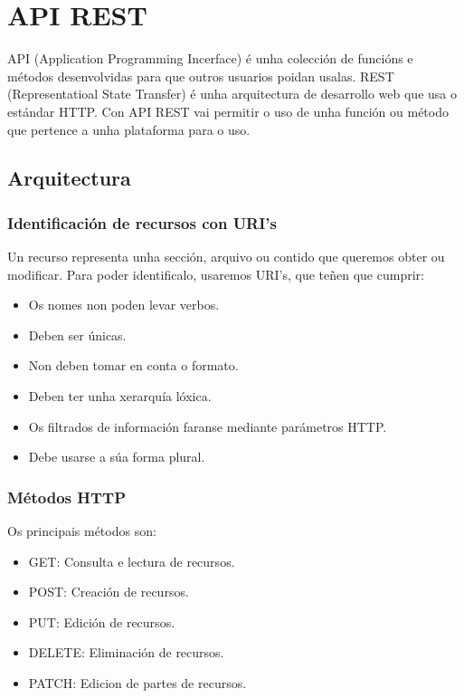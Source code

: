 \documentclass[11pt,twoside]{book}
\begin{document}
\section{API REST}

API (Application Programming Incerface) é unha colección de funcións e métodos desenvolvidas para que outros usuarios poidan usalas. 
REST (Representatioal State Transfer) é unha arquitectura de desarrollo web que usa o estándar HTTP. 
Con API REST vai permitir o uso de unha función ou método que pertence a unha plataforma para o uso.

\subsection{Arquitectura}

\subsubsection{Identificación de recursos con URI's}

Un recurso representa unha sección, arquivo ou contido que queremos obter ou modificar. Para poder identificalo, usaremos URI's, que teñen que cumprir:
\begin{itemize}
    \item Os nomes non poden levar verbos.
    \item Deben ser únicas.
    \item Non deben tomar en conta o formato.
    \item Deben ter unha xerarquía lóxica.
    \item Os filtrados de información faranse mediante parámetros HTTP.
    \item Debe usarse a súa forma plural.
\end{itemize}

\subsubsection{Métodos HTTP}

Os principais métodos son:

\begin{itemize}
    \item GET: Consulta e lectura de recursos.
    \item POST: Creación de recursos.
    \item PUT: Edición de recursos.
    \item DELETE: Eliminación de recursos.
    \item PATCH: Edicion de partes de recursos.
\end{itemize}
\end{document}
